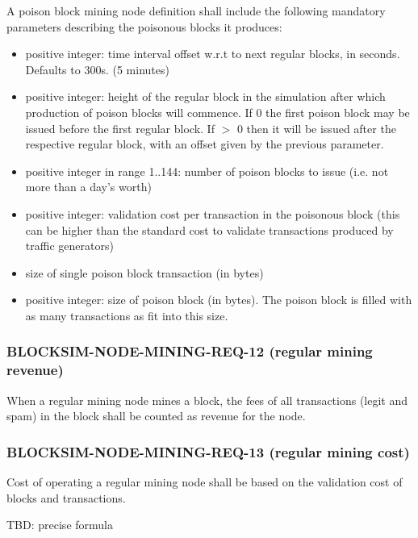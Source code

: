 \documentclass{scrreprt}
\begin{document}
        A poison block mining node definition shall include the following
        mandatory parameters describing the poisonous blocks it produces:

        \begin{itemize}
          \item positive integer: time interval offset w.r.t to next regular
            blocks, in seconds.  Defaults to 300s.  (5 minutes)
          \item positive integer: height of the regular block in the simulation
            after which production of poison blocks will commence.
            If 0 the first poison block may be issued before the first regular block.
            If $>$ 0 then it will be issued after the respective regular block, with an offset
            given by the previous parameter.
          \item positive integer in range 1..144: number of poison blocks to
            issue (i.e. not more than a day's worth)
          \item positive integer: validation cost per transaction in the
            poisonous block (this can be higher than the standard cost to validate
            transactions produced by traffic generators)
          \item size of single poison block transaction (in bytes)
          \item positive integer: size of poison block (in bytes).
            The poison block is filled with as many transactions as fit into
            this size.
        \end{itemize}

      \subsubsection{BLOCKSIM-NODE-MINING-REQ-12 (regular mining revenue)}

        When a regular mining node mines a block, the fees of all transactions
        (legit and spam) in the block shall be counted as revenue for the node.

      \subsubsection{BLOCKSIM-NODE-MINING-REQ-13 (regular mining cost)}

        Cost of operating a regular mining node shall be based on the
        validation cost of blocks and transactions.

        TBD: precise formula
\end{document}
